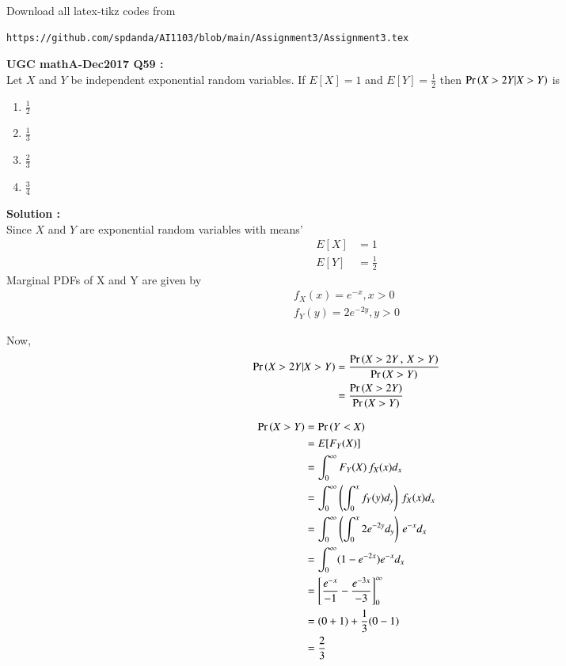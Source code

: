 \documentclass[journal,12pt,twocolumn]{IEEEtran}
\begin{document}
\maketitle
\newpage
\bigskip
\renewcommand{\thefigure}{\theenumi}
\renewcommand{\thetable}{\theenumi}
Download all latex-tikz codes from 
%
\begin{lstlisting}
https://github.com/spdanda/AI1103/blob/main/Assignment3/Assignment3.tex
\end{lstlisting}
\large\textbf{UGC mathA-Dec2017 Q59 :}\\
Let $X$ and $Y$ be independent exponential random variables. If $E[X]=1$ and $E[Y]=\frac{1}{2}$ then $\Pr\left(X>2Y|X>Y\right)$ is
\begin{multicols}{2}
    \begin{enumerate}[label=\arabic*.]
        \item \Large$\frac{1}{2}$ \\
        \item $\frac{1}{3}$
        \item $\frac{2}{3}$ \\
        \item $\frac{3}{4}$
    \end{enumerate}
\end{multicols}
\textbf{Solution :}\\
Since $X$ and $Y$ are exponential random variables with means'
\begin{align}
    E[X] &= 1 \\
    E[Y] &= \frac{1}{2}
\end{align}
Marginal PDFs of X and Y are given by
\begin{align}
    f_X(x)= e^{-x} , x>0 \\
    f_Y(y) = 2e^{-2y} , y>0
\end{align}

Now,
\begin{align}
    \Pr\left(X>2Y|X>Y\right) &= \dfrac{\Pr\left(X>2Y\,,\,X>Y\right) }{\Pr\left(X>Y\right)}\\
                  &= \dfrac{\Pr\left(X>2Y\right)}{\Pr\left(X>Y\right)} \label{simul1}
\end{align}

\begin{align}
    \Pr\left(X>Y\right) &= \Pr\left(Y<X\right)\\
             &= E[F_Y(X)]\\
             &= \int_0^\infty F_Y(X)\,f_X(x)d_x\\
             &= \int_0^\infty \left(\int_{0}^{x} f_Y(y)d_y\right)\,f_X(x)d_x \\
             &= \int_{0}^{\infty}\left(\int_{0}^{x}2e^{-2y}d_y\right)\,e^{-x}d_x \\
             &= \int_{0}^{\infty}(1-e^{-2x})e^{-x}d_x\\
             &= \left[\frac{e^{-x}}{-1} - \frac{e^{-3x}}{-3}\right]_0^\infty\\
             &=(0+1)+\frac{1}{3}(0-1) \\
             &= \frac{2}{3} \label{simul2}
\end{align}
\end{document}
